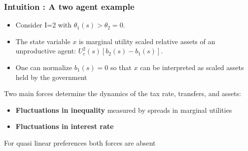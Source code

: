 \documentclass{beamer}
\begin{document}
\begin{frame}
\frametitle{Intuition :  A two agent example}

\begin{itemize}
 \item Consider I=2 with $\theta_1(s)>\theta_2=0$.
 \item The state variable $x$ is marginal utility scaled relative assets of an unproductive agent: $U^2_c(s)[b_{2}(s)-b_{1}(s)]$.
 \item One can normalize $b_{1}(s)=0$ so that $x$  can be interpreted as scaled assets held by the government
 \end{itemize}

Two main forces determine the dynamics of the tax rate, transfers,  and assets:
\begin{itemize}
 \item \textbf{Fluctuations in inequality}  measured by spreads in marginal utilities
\item  \textbf{Fluctuations in interest rate}
\end{itemize}
For quasi linear preferences both forces are absent

\end{frame}
\end{document}
